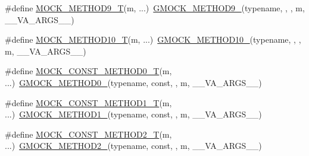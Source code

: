 \begin{DoxyCompactItemize}
\item 
\#define \mbox{\hyperlink{_obj__test_2lib_2googletest-master_2googlemock_2include_2gmock_2gmock-generated-function-mockers_8h_a838c68cbdf422cfc703b83daf1d1f1e1}{M\+O\+C\+K\+\_\+\+M\+E\+T\+H\+O\+D9\+\_\+T}}(m, ...)~\mbox{\hyperlink{_obj__test_2lib_2googletest-release-1_88_81_2googlemock_2include_2gmock_2gmock-generated-function-mockers_8h_aa820171a19cc587c247dbe05cbffc55f}{G\+M\+O\+C\+K\+\_\+\+M\+E\+T\+H\+O\+D9\+\_\+}}(typename, , , m, \+\_\+\+\_\+\+V\+A\+\_\+\+A\+R\+G\+S\+\_\+\+\_\+)
\item 
\#define \mbox{\hyperlink{_obj__test_2lib_2googletest-master_2googlemock_2include_2gmock_2gmock-generated-function-mockers_8h_aa28723ba52933b5ea9a4ffa1a73d15e1}{M\+O\+C\+K\+\_\+\+M\+E\+T\+H\+O\+D10\+\_\+T}}(m, ...)~\mbox{\hyperlink{_obj__test_2lib_2googletest-release-1_88_81_2googlemock_2include_2gmock_2gmock-generated-function-mockers_8h_a81a48223a8771de36ef92ac6d56f6e81}{G\+M\+O\+C\+K\+\_\+\+M\+E\+T\+H\+O\+D10\+\_\+}}(typename, , , m, \+\_\+\+\_\+\+V\+A\+\_\+\+A\+R\+G\+S\+\_\+\+\_\+)
\item 
\#define \mbox{\hyperlink{_obj__test_2lib_2googletest-master_2googlemock_2include_2gmock_2gmock-generated-function-mockers_8h_a5fc82f3de9d5e83b0a6bb6cda98a8887}{M\+O\+C\+K\+\_\+\+C\+O\+N\+S\+T\+\_\+\+M\+E\+T\+H\+O\+D0\+\_\+T}}(m, ...)~\mbox{\hyperlink{_obj__test_2lib_2googletest-release-1_88_81_2googlemock_2include_2gmock_2gmock-generated-function-mockers_8h_ae0d290ffa58d7c624b2e3487ba1252f4}{G\+M\+O\+C\+K\+\_\+\+M\+E\+T\+H\+O\+D0\+\_\+}}(typename, const, , m, \+\_\+\+\_\+\+V\+A\+\_\+\+A\+R\+G\+S\+\_\+\+\_\+)
\item 
\#define \mbox{\hyperlink{_obj__test_2lib_2googletest-master_2googlemock_2include_2gmock_2gmock-generated-function-mockers_8h_a46dfe8631eee86b15a79aff8a2866621}{M\+O\+C\+K\+\_\+\+C\+O\+N\+S\+T\+\_\+\+M\+E\+T\+H\+O\+D1\+\_\+T}}(m, ...)~\mbox{\hyperlink{_obj__test_2lib_2googletest-release-1_88_81_2googlemock_2include_2gmock_2gmock-generated-function-mockers_8h_a1bc0012d62440dda77208dabdf4925c9}{G\+M\+O\+C\+K\+\_\+\+M\+E\+T\+H\+O\+D1\+\_\+}}(typename, const, , m, \+\_\+\+\_\+\+V\+A\+\_\+\+A\+R\+G\+S\+\_\+\+\_\+)
\item 
\#define \mbox{\hyperlink{_obj__test_2lib_2googletest-master_2googlemock_2include_2gmock_2gmock-generated-function-mockers_8h_a4337d7257aa4edff048aa406073b718b}{M\+O\+C\+K\+\_\+\+C\+O\+N\+S\+T\+\_\+\+M\+E\+T\+H\+O\+D2\+\_\+T}}(m, ...)~\mbox{\hyperlink{_obj__test_2lib_2googletest-release-1_88_81_2googlemock_2include_2gmock_2gmock-generated-function-mockers_8h_a885295ca6bebb15efb3fc786218c5d47}{G\+M\+O\+C\+K\+\_\+\+M\+E\+T\+H\+O\+D2\+\_\+}}(typename, const, , m, \+\_\+\+\_\+\+V\+A\+\_\+\+A\+R\+G\+S\+\_\+\+\_\+)

\end{DoxyCompactItemize}
